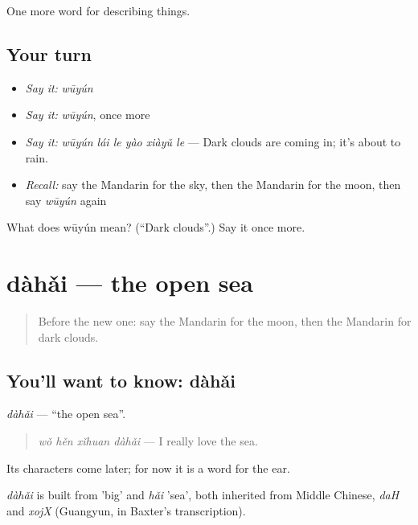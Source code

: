 \begin{grammarlens}[title={What you've built}]
One more word for describing things.
\end{grammarlens}

\subsection*{Your turn}
\begin{itemize}
\raggedright
  \item \emph{Say it:} \emph{wūyún}
  \item \emph{Say it:} \emph{wūyún}, once more
  \item \emph{Say it:} \emph{wūyún lái le yào xiàyǔ le} — Dark clouds are coming in; it's about to rain.
  \item \emph{Recall:} say the Mandarin for the sky, then the Mandarin for the moon, then say \emph{wūyún} again
\end{itemize}

\begin{tcolorbox}[breakable,colback=teal!4,colframe=teal!35!black,title={Before you move on}]
What does wūyún mean? (\textquotedblleft{}Dark clouds\textquotedblright{}.) Say it once more.
\end{tcolorbox}
\section[dàhǎi]{dàhǎi — the open sea}

\label{lesson:ZH-C238-dahai}



\begin{quote}
Before the new one: say the Mandarin for the moon, then the Mandarin for dark clouds.
\end{quote}

\subsection*{You'll want to know: dàhǎi}
\emph{dàhǎi} — \textquotedblleft{}the open sea\textquotedblright{}.

\begin{quote}
\emph{wǒ hěn xǐhuan dàhǎi} — I really love the sea.
\end{quote}

Its characters come later; for now it is a word for the ear.

\begin{cousinweb}
\emph{dàhǎi} is built from  'big' and \emph{hǎi} 'sea', both inherited from Middle Chinese, \emph{daH} and \emph{xojX} (Guangyun, in Baxter's transcription).
\end{cousinweb}


